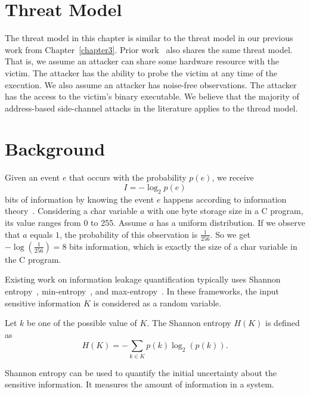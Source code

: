 \section{Threat Model}

The threat model in this chapter is similar to the threat model in our previous work from Chapter~\ref{chapter3}. Prior work~\cite{203878,182946,Brotzman19Casym} also shares the same threat model. That is, we assume
an attacker can share some hardware resource with the victim. The attacker has
the ability to probe the victim at any time of the execution. We also assume
an attacker has noise-free observations. The attacker has the access to the victim's
binary executable.  We believe that the majority of address-based side-channel attacks in the literature applies to the thread model.


\section{Background}
Given an event $e$ that occurs with the probability $p(e)$, we receive
\begin{displaymath}
    I = - \log_2p(e)
\end{displaymath}
bits of information by knowing the event $e$ happens according to information theory~\cite{shannon1948mathematical}.
Considering a char variable $a$
with one byte storage size in a C program, its value ranges from 0 to 255.
Assume $a$ has a uniform distribution. If we observe that
$a$ equals $1$, the probability of this observation is $\frac{1}{256}$. So
we get $-\log(\frac{1}{256}) = 8$ bits information, which is exactly the size
of a char variable in the C program.

Existing work on information leakage quantification typically uses Shannon
entropy~\cite{clark2007static,Wichelmann:2018:MFF:3274694.3274741},
min-entropy~\cite{10.1007/978-3-642-00596-1_21}, and max-entropy~\cite{182946,
    Doychev:2017:RAS:3062341.3062388}. In these frameworks, the input sensitive
information $K$ is considered as a random variable.

Let $k$ be one of the possible
value of $K$. The Shannon entropy $H(K)$ is defined as
\begin{displaymath}
    H(K) = - \sum_{k {\in} K}p(k)\log_2(p(k)).
\end{displaymath}

Shannon entropy can be used to quantify the initial uncertainty about the
sensitive information. It measures the amount of information in a system.

